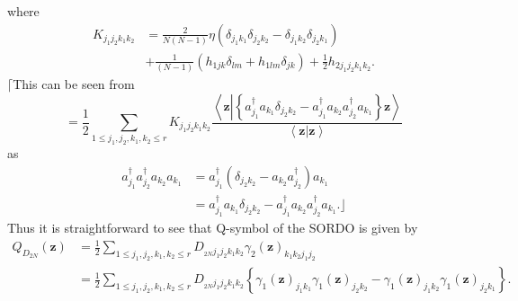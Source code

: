 \documentclass[aps,preprint]{revtex4}%
\begin{document}
where%
\begin{align}
K_{j_{1}j_{2}k_{1}k_{2}} &  =\frac{2}{N\left(  N-1\right)  }\eta\left(
\delta_{j_{1}k_{1}}\delta_{j_{2}k_{2}}-\delta_{j_{1}k_{2}}\delta_{j_{2}k_{1}%
}\right)  \nonumber\\
&  +\frac{1}{\left(  N-1\right)  }\left(  h_{1jk}\delta_{lm}+h_{1lm}%
\delta_{jk}\right)  +\frac{1}{2}h_{2j_{1}j_{2}k_{1}k_{2}}.
\end{align}
$\lceil$This can be seen from%
\begin{equation}
=\frac{1}{2}\sum_{1\leq j_{1},j_{2},k_{1},k_{2}\leq r}K_{j_{1}j_{2}k_{1}k_{2}%
}\frac{\left\langle \mathbf{z}\left\vert \left\{  a_{j_{1}}^{\dagger}a_{k_{1}%
}\delta_{j_{2}k_{2}}-a_{j_{1}}^{\dagger}a_{k_{2}}a_{j_{2}}^{\dagger}a_{k_{1}%
}\right\}  \mathbf{z}\right.  \right\rangle }{\left\langle \mathbf{z}%
\left\vert \mathbf{z}\right.  \right\rangle }%
\end{equation}
as%
\begin{align}
a_{j_{1}}^{\dagger}a_{j_{2}}^{\dagger}a_{k_{2}}a_{k_{1}} &  =a_{j_{1}%
}^{\dagger}\left(  \delta_{j_{2}k_{2}}-a_{k_{2}}a_{j_{2}}^{\dagger}\right)
a_{k_{1}}\nonumber\\
&  =a_{j_{1}}^{\dagger}a_{k_{1}}\delta_{j_{2}k_{2}}-a_{j_{1}}^{\dagger
}a_{k_{2}}a_{j_{2}}^{\dagger}a_{k_{1}}.\rfloor
\end{align}
Thus it is straightforward to see that Q-symbol of the SORDO is given by
\begin{align}
Q_{D_{2N}}\left(  \mathbf{z}\right)   &  =\frac{1}{2}\sum_{1\leq j_{1}%
,j_{2},k_{1},k_{2}\leq r}D_{_{2N}j_{1}j_{2}k_{1}k_{2}}\gamma_{2}\left(
\mathbf{z}\right)  _{k_{1}k_{2}j_{1}j_{2}}\nonumber\\
&  =\frac{1}{2}\sum_{1\leq j_{1},j_{2},k_{1},k_{2}\leq r}D_{_{2N}j_{1}%
j_{2}k_{1}k_{2}}\left\{  \gamma_{1}\left(  \mathbf{z}\right)  _{j_{1}k_{1}%
}\gamma_{1}\left(  \mathbf{z}\right)  _{j_{2}k_{2}}-\gamma_{1}\left(
\mathbf{z}\right)  _{j_{1}k_{2}}\gamma_{1}\left(  \mathbf{z}\right)
_{j_{2}k_{1}}\right\}  .
\end{align}
\end{document}
